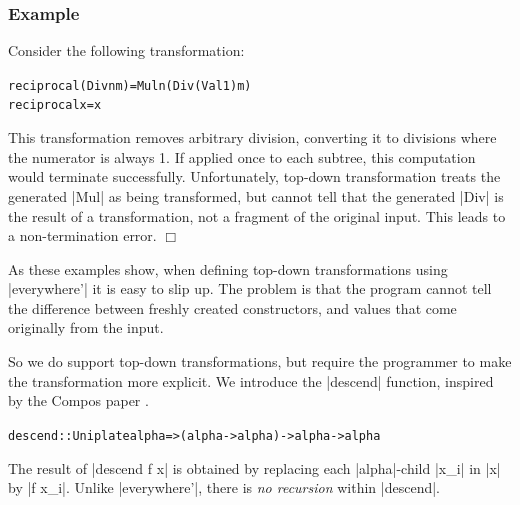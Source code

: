 \documentclass[preprint]{sigplanconf}
\let\cite=\citep
\newcounter{exmp}
\newcommand{\yesexample}{\refstepcounter{exmp}\subsubsection*{Example \arabic{exmp}}}
\newcommand{\noexample}{\hfill$\Box$}
\newenvironment{code}{\begin{alltt}\small}{\end{alltt}}
\newenvironment{example}{\yesexample}{\noexample}
\begin{document}
\begin{example}
Consider the following transformation:

\begin{code}
reciprocal (Div n m)  = Mul n (Div (Val 1) m)
reciprocal x          = x
\end{code}

This transformation removes arbitrary division, converting it to divisions where the numerator is always 1. If applied once to each subtree, this computation would terminate successfully. Unfortunately, top-down transformation treats the generated |Mul| as  being transformed, but cannot tell that the generated |Div| is the result of a transformation, not a fragment of the original input. This leads to a non-termination error.
\end{example}

As these examples show, when defining top-down transformations using |everywhere'| it is easy to slip up. The problem is that the program cannot tell the difference between freshly created constructors, and values that come originally from the input.

So we do support top-down transformations, but require the programmer to make the transformation more explicit. We introduce the |descend| function, inspired by the Compos paper \cite{bringert:compos}.

\begin{code}
descend :: Uniplate alpha => (alpha -> alpha) -> alpha -> alpha
\end{code}

The result of |descend f x| is obtained by replacing each |alpha|-child |x_i| in |x| by |f x_i|. Unlike |everywhere'|, there is \textit{no recursion} within |descend|.

\end{document}
